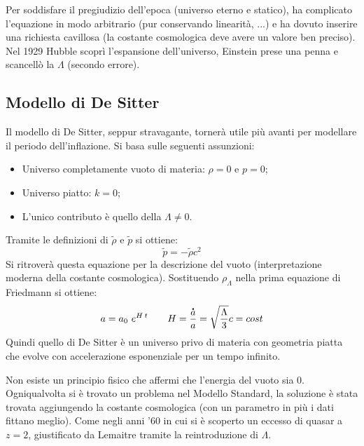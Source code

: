 Per soddisfare il pregiudizio dell'epoca (universo eterno e statico), ha complicato l'equazione in modo arbitrario (pur conservando linearità, ...) e ha dovuto inserire una richiesta cavillosa (la costante cosmologica deve avere un valore ben preciso). Nel 1929 Hubble scoprì l'espansione dell'universo, Einstein prese una penna e scancellò la $\Lambda$ (secondo errore).

\subsection{Modello di De Sitter}
Il modello di De Sitter, seppur stravagante, tornerà utile più avanti per modellare il periodo dell'inflazione. Si basa sulle seguenti assunzioni:
\begin{itemize}
    \item Universo completamente vuoto di materia: $\rho=0$ e $p=0$;
    \item Universo piatto: $k=0$;
    \item L'unico contributo è quello della $\Lambda\neq 0$.
\end{itemize}
Tramite le definizioni di $\tilde{\rho}$ e $\tilde{p} $ si ottiene:
$$
\tilde{p}=-\tilde{\rho}c^2
$$
Si ritroverà questa equazione per la descrizione del vuoto (interpretazione moderna della costante cosmologica). Sostituendo $\rho_\Lambda$ nella prima equazione di Friedmann si ottiene:
\begin{equation}
    a = a_0~e^{H\: t}\qquad H=\frac{\accentset{\mbox{\large\bfseries .}}{a}}{a}=\sqrt{\frac{\Lambda}{3}}c= cost
\end{equation}
Quindi quello di De Sitter è un universo privo di materia con geometria piatta che evolve con accelerazione esponenziale per un tempo infinito. 

Non esiste un principio fisico che affermi che l'energia del vuoto sia 0. Ogniqualvolta si è trovato un problema nel Modello Standard, la soluzione è stata trovata aggiungendo la costante cosmologica (con un parametro in più i dati fittano meglio). Come negli anni '60 in cui si è scoperto un eccesso di quasar a $z=2$, giustificato da Lemaitre tramite la reintroduzione di $\Lambda$.
\vspace*{0.5em}

